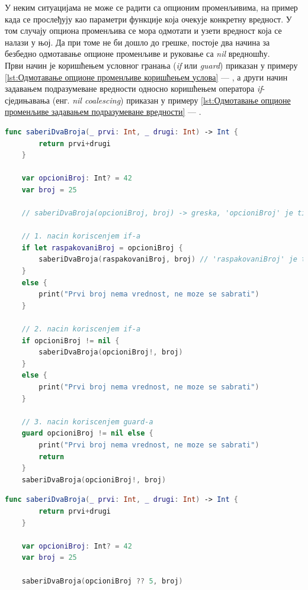 \documentclass[12pt,oneside]{memoir}
\begin{document}
\indent У неким ситуацијама не може се радити са опционим променљивима, на пример када се прослеђују као параметри функције која очекује конкретну вредност. У том случају опциона променљива се мора одмотати и узети вредност која се налази у њој. Да при томе не би дошло до грешке, постоје два начина за безбедно одмотавање опционе променљиве и руковање са \textit{nil} вредношћу.
\\
\indent Први начин је коришћењем условног гранања (\textit{if} или \textit{guard}) приказан у примеру \ref{lst:Одмотавање опционе променљиве коришћењем услова} --- , а други начин задавањем подразумеване вредности односно коришћењем оператора \textit{if}-сједињавања (енг. \textit{nil coalescing}) приказан у примеру \ref{lst:Одмотавање опционе променљиве задавањем подразумеване вредности} --- .

\begin{lstlisting}[caption=\textit{{Одмотавање опционе променљиве коришћењем услова}}, label={lst:Одмотавање опционе променљиве коришћењем услова}, language=Swift, frame=single]
    func saberiDvaBroja(_ prvi: Int, _ drugi: Int) -> Int {
        return prvi+drugi
    }
    
    var opcioniBroj: Int? = 42
    var broj = 25
    
    // saberiDvaBroja(opcioniBroj, broj) -> greska, 'opcioniBroj' je tipa Int? dok funkcija ocekuje parametar tipa Int
    
    // 1. nacin koriscenjem if-a
    if let raspakovaniBroj = opcioniBroj {
        saberiDvaBroja(raspakovaniBroj, broj) // 'raspakovaniBroj' je tipa Int
    }
    else {
        print("Prvi broj nema vrednost, ne moze se sabrati")
    }
    
    // 2. nacin koriscenjem if-a
    if opcioniBroj != nil {
        saberiDvaBroja(opcioniBroj!, broj)
    }
    else {
        print("Prvi broj nema vrednost, ne moze se sabrati")
    }
    
    // 3. nacin koriscenjem guard-a
    guard opcioniBroj != nil else {
        print("Prvi broj nema vrednost, ne moze se sabrati")
        return
    }
    saberiDvaBroja(opcioniBroj!, broj)
\end{lstlisting}

\begin{lstlisting}[caption=\textit{{Одмотавање опционе променљиве задавањем подразумеване вредности}}, label={lst:Одмотавање опционе променљиве задавањем подразумеване вредности}, language=Swift, frame=single]
    func saberiDvaBroja(_ prvi: Int, _ drugi: Int) -> Int {
        return prvi+drugi
    }
    
    var opcioniBroj: Int? = 42
    var broj = 25
    
    saberiDvaBroja(opcioniBroj ?? 5, broj)
\end{lstlisting}
\end{document}
